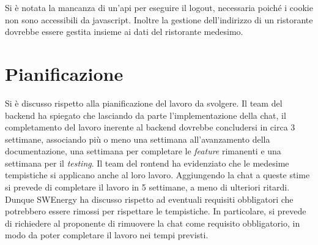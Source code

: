 Si è notata la mancanza di un'api per eseguire il logout, necessaria poiché i
cookie non sono accessibili da javascript. Inoltre la gestione dell'indirizzo
di un ristorante dovrebbe essere gestita insieme ai dati del ristorante
medesimo.

\section{Pianificazione}

Si è discusso rispetto alla pianificazione del lavoro da svolgere. Il team del
backend ha spiegato che lasciando da parte l'implementazione della chat, il
completamento del lavoro inerente al backend dovrebbe concludersi in circa 3
settimane, associando più o meno una settimana all'avanzamento della
documentazione, una settimana per completare le \textit{feature} rimanenti e una
settimana per il \textit{testing}. Il team del rontend ha evidenziato che le medesime
tempistiche si applicano anche al loro lavoro. Aggiungendo la chat a queste
stime si prevede di completare il lavoro in 5 settimane, a meno di ulteriori
ritardi. Dunque SWEnergy ha discusso rispetto ad eventuali requisiti obbligatori
che potrebbero essere rimossi per rispettare le tempistiche. In particolare, si
prevede di richiedere al proponente di rimuovere la chat come requisito
obbligatorio, in modo da poter completare il lavoro nei tempi previsti.
